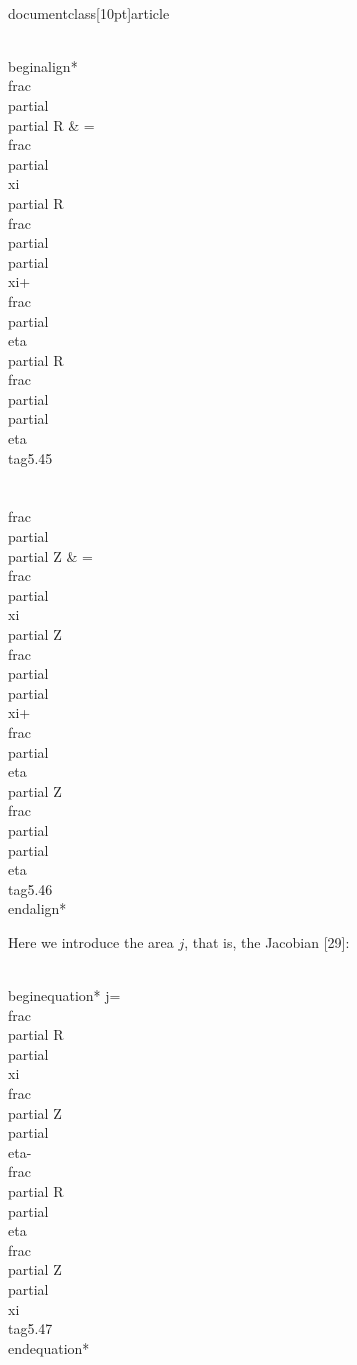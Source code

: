 \\documentclass[10pt]{article}
\begin{document}
{\\begin{align*}
\\frac{\\partial}{\\partial R} & =\\frac{\\partial \\xi}{\\partial R} \\frac{\\partial}{\\partial \\xi}+\\frac{\\partial \\eta}{\\partial R} \\frac{\\partial}{\\partial \\eta}  \\tag{5.45}\\\\
\\frac{\\partial}{\\partial Z} & =\\frac{\\partial \\xi}{\\partial Z} \\frac{\\partial}{\\partial \\xi}+\\frac{\\partial \\eta}{\\partial Z} \\frac{\\partial}{\\partial \\eta} \\tag{5.46}
\\end{align*}


Here we introduce the area $j$, that is, the Jacobian [29]:


\\begin{equation*}
j=\\frac{\\partial R}{\\partial \\xi} \\frac{\\partial Z}{\\partial \\eta}-\\frac{\\partial R}{\\partial \\eta} \\frac{\\partial Z}{\\partial \\xi} \\tag{5.47}
\\end{equation*}


}
\end{document}
